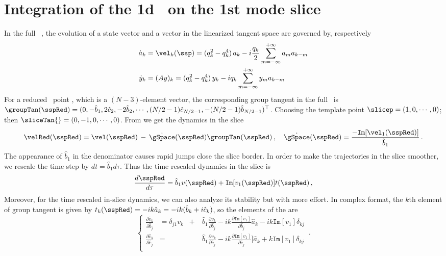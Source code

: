 \chapter{Integration of the 1d \KSe\ on the 1st mode slice}
\label{append:ksint}

\renewcommand{\Im}{\mathtt{Im}}
\renewcommand{\Re}{\mathtt{Re}}

In the full \statesp\ , the evolution of a state
vector and a vector in the linearized tangent space are governed
by, respectively
\begin{align*}
  \dot{a}_k & = \vel_k(\ssp) =
              ( q_k^2 - q_k^4 )\, a_k
              - i \frac{q_k}{2} \sum_{m=-\infty}^{+\infty} a_m a_{k-m} \\
  \dot{y}_k & = (Ay)_k =
              ( q_k^2 - q_k^4 )\, y_k
              - i q_k \sum_{m=-\infty}^{+\infty} y_m a_{k-m} \\
\end{align*}
For a reduced \statesp\ point , which is 
a $(N-3)$-element vector, the corresponding group tangent in the full
\statesp\ is 
$\groupTan(\sspRed) = (0, -\hat{b}_{1}, 2\hat{c}_{2}, -2\hat{b}_{2}, \cdots, 
(N/2-1)\hat{c}_{N/2-1}, -(N/2-1)\hat{b}_{N/2-1})^\top$. 
Choosing the template point $\slicep=(1,0,\cdots,0)$;
then $\sliceTan{} = (0, -1, 0, \cdots, 0)$.
From 
we get the dynamics in the slice 
\[
  \velRed(\sspRed) = \vel(\sspRed)
  \,-\, \dot{\gSpace}(\sspRed) \groupTan(\sspRed)
  \,,\quad
  \dot{\gSpace}(\sspRed) = \frac{-\Im[\vel_1(\sspRed)] }{ \hat{b}_{1} }
  \,.
\]
The appearance of $\hat{b}_{1}$ in the denominator causes rapid jumps close the 
slice border. In order to make the trajectories in the slice smoother, we 
rescale the time step by $dt=\hat{b}_1 d\tau$. 
Thus the time rescaled dynamics in the slice is
\[
  \frac{d \sspRed}{d\tau} = \hat{b}_1 v(\sspRed) + \mathtt{Im}[v_1(\sspRed)] t(\sspRed)
  \,,
\]
Moreover, for the time rescaled
in-slice dynamics, we can also analyze its stability but with more effort.
In complex format, the $k$th element of group tangent is given by 
$t_k(\sspRed) = -ik \hat{a}_k = -ik(\hat{b}_k + i\hat{c}_k)$, so 
the elements of the {\stabmat} are
\[
  \left\{
    \begin{aligned}
      \frac{\partial \hat{v}_k}{\partial \hat{b}_j} & =
      \delta_{j1}v_k \;\;+ & \hat{b}_1 \frac{\partial v_k}{\partial  \hat{b}_j} - ik
      \frac{\partial \Im[v_1]}{\partial \hat{b}_j} \hat{a}_k - ik \Im[v_1]\delta_{kj} \\
      \frac{\partial \hat{v}_k}{\partial \hat{c}_j} & =
      & \hat{b}_1 \frac{\partial v_k}{\partial \hat{c}_j} - ik
      \frac{\partial \Im[v_1]}{\partial \hat{c}_j}] \hat{a}_k + k\Im[v_1] \delta_{kj} \\
    \end{aligned}
  \right.\,.
\]
